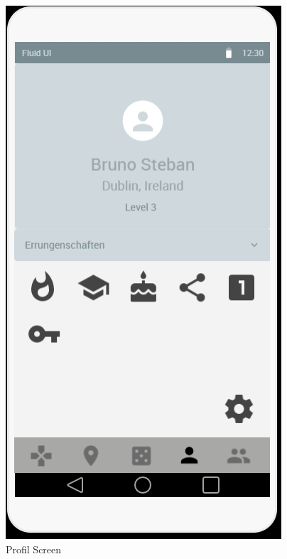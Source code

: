 \begin{figure}[H]
\begin{minipage}[b]{0.4\textwidth}
    \includegraphics[width=\textwidth]{images/ProfileScreen.PNG}
    \caption{Profil Screen}
    \label{fig:profileScreen}
  \end{minipage}
\end{figure}

